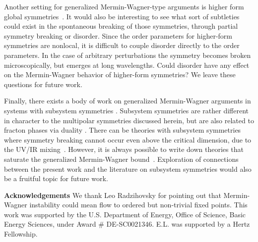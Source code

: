 \documentclass[prb,aps,twocolumn, amsfonts,amsmath,amssymb,nofootinbib,superscriptaddress]{revtex4-2}
\begin{document}
Another setting for generalized Mermin-Wagner-type arguments is higher form global symmetries~\cite{GKSW, Lake, Marvin}. It would also be interesting to see what sort of subtleties could exist in the spontaneous breaking of those symmetries, through partial symmetry breaking or disorder. Since the order parameters for higher-form symmetries are nonlocal, it is difficult to couple disorder directly to the order parameters. In the case of arbitrary perturbations the symmetry becomes broken microscopically, but emerges at long wavelengths. Could disorder have any effect on the Mermin-Wagner behavior of higher-form symmetries? We leave these questions for future work. 

Finally, there exists a body of work on generalized Mermin-Wagner arguments in systems with subsystem symmetries \cite{Batista2005, SeibergA, SeibergB, SeibergC, Gorantla2021, Distler2021}. Subsystem symmetries are rather different in character to the multipolar symmetries discussed herein, but are also related to fracton phases via duality \cite{VHF2}. There can be theories with subsystem symmetries where symmetry breaking cannot occur even above the critical dimension, due to the UV/IR mixing~\cite{Gorantla2021}. However, it is always possible to write down theories that saturate the generalized Mermin-Wagner bound~\cite{Distler2021}.
Exploration of connections between the present work and the literature on subsystem symmetries would also be a fruitful topic for future work. 

{\bf Acknowledgements} We thank Leo Radzihovsky for pointing out that Mermin-Wagner instability could mean flow to ordered but non-trivial fixed points. This work was supported by
the U.S. Department of Energy, Office of Science, Basic Energy Sciences, under Award \# DE-SC0021346. E.L. was supported by a Hertz Fellowship. 


\end{document}
